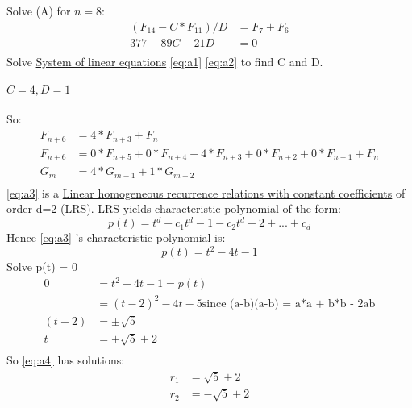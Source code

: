 \documentclass[12pt]{report}
\begin{document}
Solve (A) for \(n=8\): 
\begin{equation} \label{eq:a2}
\begin{aligned}
  (F_{14} - C*F_11) / D &= F_7 + F_6 \\
  377 - 89C - 21D &= 0         \\
\end{aligned}
\end{equation} 
Solve \href{https://en.wikipedia.org/wiki/System_of_linear_equations}{System of linear equations}  \eqref{eq:a1} \eqref{eq:a2} to find C and D. \\ \\
\(C = 4, D = 1\) \\ \\
So: \\
\begin{equation} 
\begin{aligned} \label{eq:a3}
 F_{n+6} &= 4*F_{n+3} + F_n     \\
 F_{n+6} &=  0*F_{n+5} + 0*F_{n+4} + 4*F_{n+3} + 0*F_{n+2} + 0*F_{n+1} + F_n \\
 G_m &= 4*G_{m-1} + 1*G_{m-2} \\
\end{aligned}
\end{equation} 
\eqref{eq:a3} is a \href{http://en.wikipedia.org/wiki/Recurrence_relation#Linear_homogeneous_recurrence_relations_with_constant_coefficients}{Linear homogeneous recurrence relations with constant coefficients} of order d=2 (LRS). LRS yields characteristic polynomial of the form: 
\begin{equation} 
   p(t) = t^d - c_1t^d-1 - c_2t^d-2 + ... + c_d
\end{equation} 
 Hence \eqref{eq:a3} 's characteristic polynomial is:
\begin{equation} 
   p(t) = t^2 - 4t - 1
\end{equation} 
Solve p(t) = 0 
\begin{equation}
\begin{aligned} \label{eq:a4}
   0 &= t^2 - 4t - 1 = p(t) \\
     &= (t-2)^2 -4t - 5           \text{since (a-b)(a-b) = a*a + b*b - 2ab} \\
    (t-2) &= \pm \sqrt{5} \\
    t &= \pm \sqrt{5} + 2 \\
\end{aligned}
\end{equation}  
So \eqref{eq:a4} has solutions: 
\begin{equation}  
\begin{aligned}
   r_1 &= \sqrt{5} + 2 \\
   r_2 &= -\sqrt{5} + 2  \\
\end{aligned}
\end{equation} 
\end{document}
